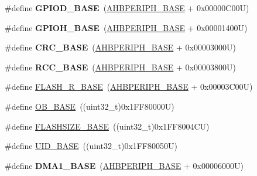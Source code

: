 \begin{DoxyCompactItemize}
\item 
\hypertarget{group___peripheral__memory__map_ga1a93ab27129f04064089616910c296ec}{\#define {\bfseries G\-P\-I\-O\-D\-\_\-\-B\-A\-S\-E}~(\hyperlink{group___peripheral__memory__map_ga92eb5d49730765d2abd0f5b09548f9f5}{A\-H\-B\-P\-E\-R\-I\-P\-H\-\_\-\-B\-A\-S\-E} + 0x00000\-C00\-U)}\label{group___peripheral__memory__map_ga1a93ab27129f04064089616910c296ec}

\item 
\hypertarget{group___peripheral__memory__map_gaee4716389f3a1c727495375b76645608}{\#define {\bfseries G\-P\-I\-O\-H\-\_\-\-B\-A\-S\-E}~(\hyperlink{group___peripheral__memory__map_ga92eb5d49730765d2abd0f5b09548f9f5}{A\-H\-B\-P\-E\-R\-I\-P\-H\-\_\-\-B\-A\-S\-E} + 0x00001400\-U)}\label{group___peripheral__memory__map_gaee4716389f3a1c727495375b76645608}

\item 
\hypertarget{group___peripheral__memory__map_ga656a447589e785594cbf2f45c835ad7e}{\#define {\bfseries C\-R\-C\-\_\-\-B\-A\-S\-E}~(\hyperlink{group___peripheral__memory__map_ga92eb5d49730765d2abd0f5b09548f9f5}{A\-H\-B\-P\-E\-R\-I\-P\-H\-\_\-\-B\-A\-S\-E} + 0x00003000\-U)}\label{group___peripheral__memory__map_ga656a447589e785594cbf2f45c835ad7e}

\item 
\hypertarget{group___peripheral__memory__map_ga0e681b03f364532055d88f63fec0d99d}{\#define {\bfseries R\-C\-C\-\_\-\-B\-A\-S\-E}~(\hyperlink{group___peripheral__memory__map_ga92eb5d49730765d2abd0f5b09548f9f5}{A\-H\-B\-P\-E\-R\-I\-P\-H\-\_\-\-B\-A\-S\-E} + 0x00003800\-U)}\label{group___peripheral__memory__map_ga0e681b03f364532055d88f63fec0d99d}

\item 
\#define \hyperlink{group___peripheral__memory__map_ga8e21f4845015730c5731763169ec0e9b}{F\-L\-A\-S\-H\-\_\-\-R\-\_\-\-B\-A\-S\-E}~(\hyperlink{group___peripheral__memory__map_ga92eb5d49730765d2abd0f5b09548f9f5}{A\-H\-B\-P\-E\-R\-I\-P\-H\-\_\-\-B\-A\-S\-E} + 0x00003\-C00\-U)
\item 
\#define \hyperlink{group___peripheral__memory__map_gab5b5fb155f9ee15dfb6d757da1adc926}{O\-B\-\_\-\-B\-A\-S\-E}~((uint32\-\_\-t)0x1\-F\-F80000\-U)
\item 
\#define \hyperlink{group___peripheral__memory__map_ga776d985f2d4d40b588ef6ca9d573af78}{F\-L\-A\-S\-H\-S\-I\-Z\-E\-\_\-\-B\-A\-S\-E}~((uint32\-\_\-t)0x1\-F\-F8004\-C\-U)
\item 
\#define \hyperlink{group___peripheral__memory__map_ga664eda42b83c919b153b07b23348be67}{U\-I\-D\-\_\-\-B\-A\-S\-E}~((uint32\-\_\-t)0x1\-F\-F80050\-U)
\item 
\hypertarget{group___peripheral__memory__map_gab2d8a917a0e4ea99a22ac6ebf279bc72}{\#define {\bfseries D\-M\-A1\-\_\-\-B\-A\-S\-E}~(\hyperlink{group___peripheral__memory__map_ga92eb5d49730765d2abd0f5b09548f9f5}{A\-H\-B\-P\-E\-R\-I\-P\-H\-\_\-\-B\-A\-S\-E} + 0x00006000\-U)}\label{group___peripheral__memory__map_gab2d8a917a0e4ea99a22ac6ebf279bc72}


\end{DoxyCompactItemize}
